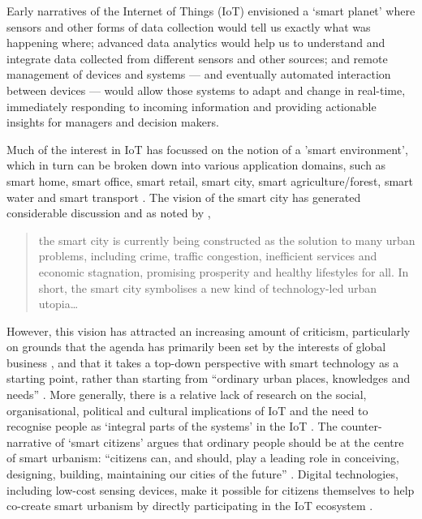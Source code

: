 Early narratives of the Internet of Things (IoT) envisioned a ‘smart planet’
where sensors and other forms of data
collection would tell us exactly what was happening where;
advanced data analytics would help us to understand and integrate data
collected from different sensors and other sources; and remote
management of devices and systems --- and eventually automated
interaction between devices --- would allow those systems to adapt and
change in real-time, immediately responding to incoming information
and providing actionable insights for managers and decision makers.  

Much of the interest in IoT has focussed on the notion of a 'smart
environment', which in turn can be broken down into various
application domains, such as smart home, smart office, smart retail,
smart city, smart agriculture/forest, smart water and smart transport \cite{Gubbi-2013-IOT}.
The vision of the smart city has generated considerable discussion and
as noted by \cite{Hollands-2015-CIIT}, 

\begin{quote}
  the smart city is currently being constructed as the solution to
  many urban problems, including crime, traffic congestion, inefficient
  services and economic stagnation, promising prosperity and healthy
  lifestyles for all. In short, the smart city symbolises a new kind
  of technology-led urban utopia\ldots
\end{quote}

However, this vision has attracted an increasing amount of criticism,
particularly on grounds that the agenda has primarily been set by the
interests of global business \cite{Hollands-2015-CIIT}, and that it
takes a top-down perspective with smart technology as a starting
point, rather than starting from ``ordinary urban places, knowledges
and needs'' \cite{Mcfarlane-2017-OASC}.  More generally, there is a
relative lack of research on the social, organisational, political and
cultural implications of IoT and the need to recognise people as
‘integral parts of the systems’ in the IoT \cite{Shin-2014-ASTF}.  The
counter-narrative of `smart citizens' argues that ordinary people
should be at the centre of smart urbanism: ``citizens can, and should,
play a leading role in conceiving, designing, building, maintaining
our cities of the future'' \cite{Hemment-2013-SC,Hemment-2016-HTDU}.
Digital technologies, including low-cost sensing devices, make it
possible for citizens themselves to help co-create smart urbanism by
directly participating in the IoT ecosystem
\cite{Balestrini-2017-OCTT}.

